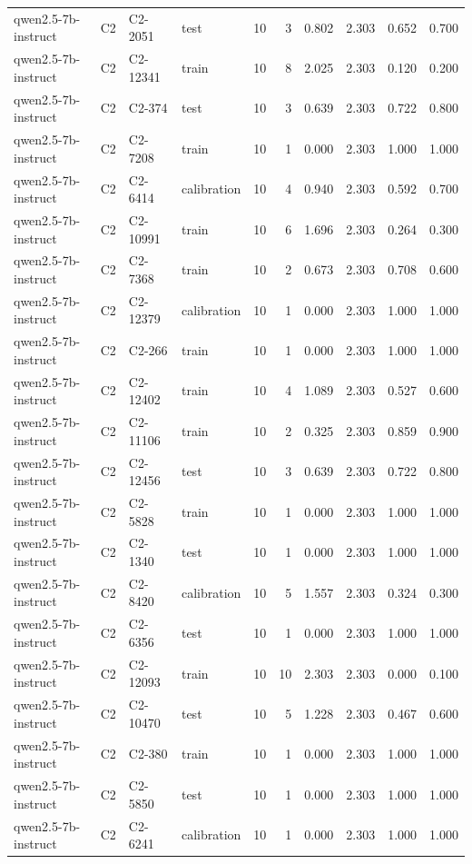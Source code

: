 \begin{table}
\begin{tabular}{llllrrrrrr}
qwen2.5-7b-instruct & C2 & C2-2051 & test & 10 & 3 & 0.802 & 2.303 & 0.652 & 0.700 \\
qwen2.5-7b-instruct & C2 & C2-12341 & train & 10 & 8 & 2.025 & 2.303 & 0.120 & 0.200 \\
qwen2.5-7b-instruct & C2 & C2-374 & test & 10 & 3 & 0.639 & 2.303 & 0.722 & 0.800 \\
qwen2.5-7b-instruct & C2 & C2-7208 & train & 10 & 1 & 0.000 & 2.303 & 1.000 & 1.000 \\
qwen2.5-7b-instruct & C2 & C2-6414 & calibration & 10 & 4 & 0.940 & 2.303 & 0.592 & 0.700 \\
qwen2.5-7b-instruct & C2 & C2-10991 & train & 10 & 6 & 1.696 & 2.303 & 0.264 & 0.300 \\
qwen2.5-7b-instruct & C2 & C2-7368 & train & 10 & 2 & 0.673 & 2.303 & 0.708 & 0.600 \\
qwen2.5-7b-instruct & C2 & C2-12379 & calibration & 10 & 1 & 0.000 & 2.303 & 1.000 & 1.000 \\
qwen2.5-7b-instruct & C2 & C2-266 & train & 10 & 1 & 0.000 & 2.303 & 1.000 & 1.000 \\
qwen2.5-7b-instruct & C2 & C2-12402 & train & 10 & 4 & 1.089 & 2.303 & 0.527 & 0.600 \\
qwen2.5-7b-instruct & C2 & C2-11106 & train & 10 & 2 & 0.325 & 2.303 & 0.859 & 0.900 \\
qwen2.5-7b-instruct & C2 & C2-12456 & test & 10 & 3 & 0.639 & 2.303 & 0.722 & 0.800 \\
qwen2.5-7b-instruct & C2 & C2-5828 & train & 10 & 1 & 0.000 & 2.303 & 1.000 & 1.000 \\
qwen2.5-7b-instruct & C2 & C2-1340 & test & 10 & 1 & 0.000 & 2.303 & 1.000 & 1.000 \\
qwen2.5-7b-instruct & C2 & C2-8420 & calibration & 10 & 5 & 1.557 & 2.303 & 0.324 & 0.300 \\
qwen2.5-7b-instruct & C2 & C2-6356 & test & 10 & 1 & 0.000 & 2.303 & 1.000 & 1.000 \\
qwen2.5-7b-instruct & C2 & C2-12093 & train & 10 & 10 & 2.303 & 2.303 & 0.000 & 0.100 \\
qwen2.5-7b-instruct & C2 & C2-10470 & test & 10 & 5 & 1.228 & 2.303 & 0.467 & 0.600 \\
qwen2.5-7b-instruct & C2 & C2-380 & train & 10 & 1 & 0.000 & 2.303 & 1.000 & 1.000 \\
qwen2.5-7b-instruct & C2 & C2-5850 & test & 10 & 1 & 0.000 & 2.303 & 1.000 & 1.000 \\
qwen2.5-7b-instruct & C2 & C2-6241 & calibration & 10 & 1 & 0.000 & 2.303 & 1.000 & 1.000 \\

\end{tabular}
\end{table}
